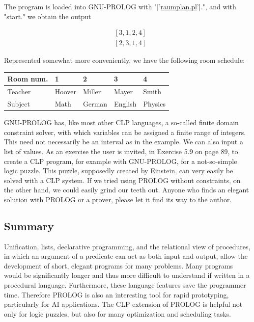 \documentclass[10pt]{book}
\begin{document}
The program is loaded into GNU-PROLOG with "['\href{http://raumplan.pl}{raumplan.pl}'].", and with "start." we obtain the output

$$
\begin{aligned}
& {[3,1,2,4]} \\
& {[2,3,1,4]}
\end{aligned}
$$

Represented somewhat more conveniently, we have the following room schedule:

\begin{center}
\begin{tabular}{lllll}
\hline
Room num. & 1 & 2 & 3 & 4 \\
\hline
Teacher & Hoover & Miller & Mayer & Smith \\
\hline
Subject & Math & German & English & Physics \\
\hline
\end{tabular}
\end{center}

GNU-PROLOG has, like most other CLP languages, a so-called finite domain constraint solver, with which variables can be assigned a finite range of integers. This need not necessarily be an interval as in the example. We can also input a list of values. As an exercise the user is invited, in Exercise 5.9 on page 89, to create a CLP program, for example with GNU-PROLOG, for a not-so-simple logic puzzle. This puzzle, supposedly created by Einstein, can very easily be solved with a CLP system. If we tried using PROLOG without constraints, on the other hand, we could easily grind our teeth out. Anyone who finds an elegant solution with PROLOG or a prover, please let it find its way to the author.

\subsection*{Summary}
Unification, lists, declarative programming, and the relational view of procedures, in which an argument of a predicate can act as both input and output, allow the development of short, elegant programs for many problems. Many programs would be significantly longer and thus more difficult to understand if written in a procedural language. Furthermore, these language features save the programmer time. Therefore PROLOG is also an interesting tool for rapid prototyping, particularly for AI applications. The CLP extension of PROLOG is helpful not only for logic puzzles, but also for many optimization and scheduling tasks.
\end{document}
